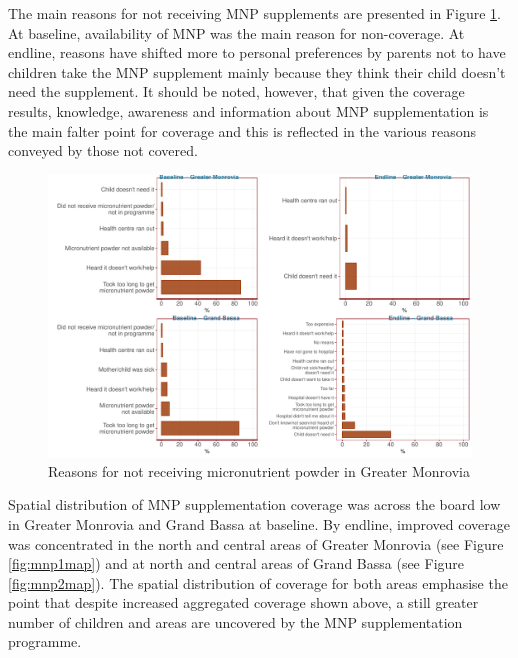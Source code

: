 \documentclass[12pt,a4paper]{article}
\begin{document}
The main reasons for not receiving MNP supplements are presented in Figure \ref{fig:mnp2plot}. At baseline, availability of MNP was the main reason for non-coverage. At endline, reasons have shifted more to personal preferences by parents not to have children take the MNP supplement mainly because they think their child doesn't need the supplement. It should be noted, however, that given the coverage results, knowledge, awareness and information about MNP supplementation is the main falter point for coverage and this is reflected in the various reasons conveyed by those not covered.

\begin{figure}[H]

{\centering \includegraphics{liberiaCoverageFinalReport_files/figure-latex/mnp2plot-1} 

}

\caption{Reasons for not receiving micronutrient powder in Greater Monrovia}\label{fig:mnp2plot}
\end{figure}

Spatial distribution of MNP supplementation coverage was across the board low in Greater Monrovia and Grand Bassa at baseline. By endline, improved coverage was concentrated in the north and central areas of Greater Monrovia (see Figure \ref{fig:mnp1map}) and at north and central areas of Grand Bassa (see Figure \ref{fig:mnp2map}). The spatial distribution of coverage for both areas emphasise the point that despite increased aggregated coverage shown above, a still greater number of children and areas are uncovered by the MNP supplementation programme.
\end{document}

